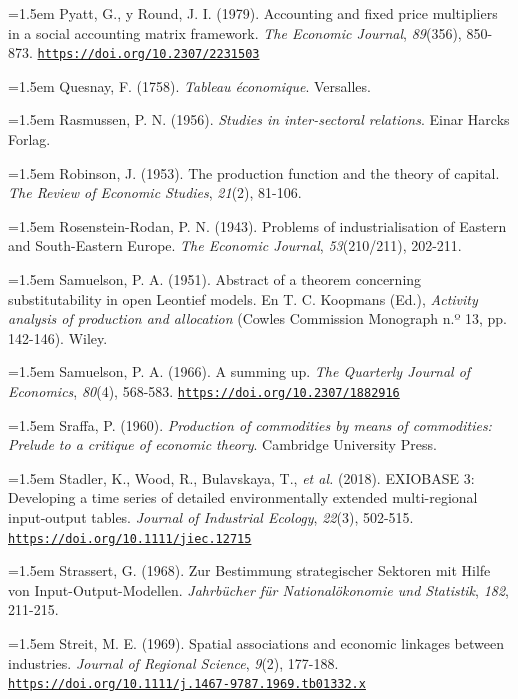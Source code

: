 \documentclass[10pt,a4paper]{article}
\begin{document}
\noindent\hangindent=1.5em Pyatt, G., y Round, J. I. (1979). Accounting and fixed price multipliers in a social accounting matrix framework. \textit{The Economic Journal}, \textit{89}(356), 850-873. \href{https://doi.org/10.2307/2231503}{\nolinkurl{https://doi.org/10.2307/2231503}}

\noindent\hangindent=1.5em Quesnay, F. (1758). \textit{Tableau économique}. Versalles.

\noindent\hangindent=1.5em Rasmussen, P. N. (1956). \textit{Studies in inter-sectoral relations}. Einar Harcks Forlag.

\noindent\hangindent=1.5em Robinson, J. (1953). The production function and the theory of capital. \textit{The Review of Economic Studies}, \textit{21}(2), 81-106.

\noindent\hangindent=1.5em Rosenstein-Rodan, P. N. (1943). Problems of industrialisation of Eastern and South-Eastern Europe. \textit{The Economic Journal}, \textit{53}(210/211), 202-211.

\noindent\hangindent=1.5em Samuelson, P. A. (1951). Abstract of a theorem concerning substitutability in open Leontief models. En T. C. Koopmans (Ed.), \textit{Activity analysis of production and allocation} (Cowles Commission Monograph n.º 13, pp. 142-146). Wiley.

\noindent\hangindent=1.5em Samuelson, P. A. (1966). A summing up. \textit{The Quarterly Journal of Economics}, \textit{80}(4), 568-583. \href{https://doi.org/10.2307/1882916}{\nolinkurl{https://doi.org/10.2307/1882916}}

\noindent\hangindent=1.5em Sraffa, P. (1960). \textit{Production of commodities by means of commodities: Prelude to a critique of economic theory}. Cambridge University Press.

\noindent\hangindent=1.5em Stadler, K., Wood, R., Bulavskaya, T., \textit{et al.} (2018). EXIOBASE 3: Developing a time series of detailed environmentally extended multi-regional input-output tables. \textit{Journal of Industrial Ecology}, \textit{22}(3), 502-515. \href{https://doi.org/10.1111/jiec.12715}{\nolinkurl{https://doi.org/10.1111/jiec.12715}}

\noindent\hangindent=1.5em Strassert, G. (1968). Zur Bestimmung strategischer Sektoren mit Hilfe von Input-Output-Modellen. \textit{Jahrbücher für Nationalökonomie und Statistik}, \textit{182}, 211-215.

\noindent\hangindent=1.5em Streit, M. E. (1969). Spatial associations and economic linkages between industries. \textit{Journal of Regional Science}, \textit{9}(2), 177-188. \href{https://doi.org/10.1111/j.1467-9787.1969.tb01332.x}{\nolinkurl{https://doi.org/10.1111/j.1467-9787.1969.tb01332.x}}
\end{document}

